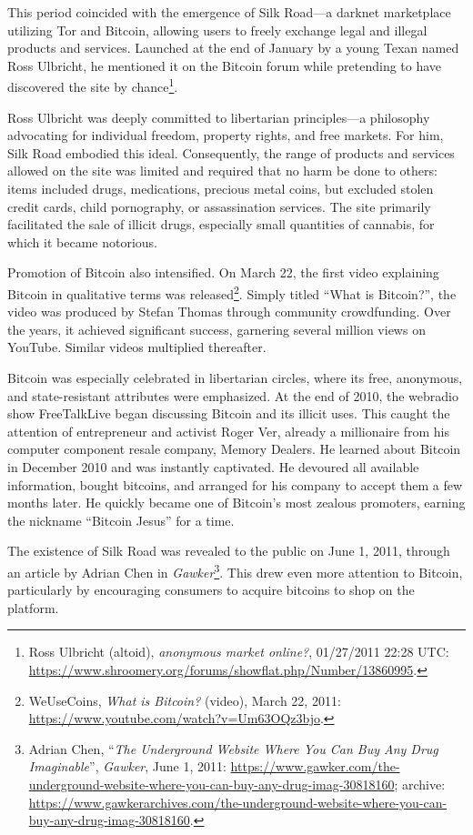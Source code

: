 \documentclass[
  a5paper,
  smalldemyvopaper,10pt,twoside,onecolumn,openright,extrafontsizes,hidelinks]{memoir}
\begin{document}
This period coincided with the emergence of Silk Road---a darknet
marketplace utilizing Tor and Bitcoin, allowing users to freely exchange
legal and illegal products and services. Launched at the end of January
by a young Texan named Ross Ulbricht, he mentioned it on the Bitcoin
forum while pretending to have discovered the site by chance\footnote{Ross
  Ulbricht (altoid), \emph{anonymous market online?}, 01/27/2011 22:28
  UTC:
  \url{https://www.shroomery.org/forums/showflat.php/Number/13860995}.}.

Ross Ulbricht was deeply committed to libertarian principles---a
philosophy advocating for individual freedom, property rights, and free
markets. For him, Silk Road embodied this ideal. Consequently, the range
of products and services allowed on the site was limited and required
that no harm be done to others: items included drugs, medications,
precious metal coins, but excluded stolen credit cards, child
pornography, or assassination services. The site primarily facilitated
the sale of illicit drugs, especially small quantities of cannabis, for
which it became notorious.

Promotion of Bitcoin also intensified. On March 22, the first video
explaining Bitcoin in qualitative terms was released\footnote{WeUseCoins,
  \emph{What is Bitcoin?} (video), March 22, 2011:
  \url{https://www.youtube.com/watch?v=Um63OQz3bjo}.}. Simply titled
``What is Bitcoin?'', the video was produced by Stefan Thomas through
community crowdfunding. Over the years, it achieved significant success,
garnering several million views on YouTube. Similar videos multiplied
thereafter.

Bitcoin was especially celebrated in libertarian circles, where its
free, anonymous, and state-resistant attributes were emphasized. At the
end of 2010, the webradio show FreeTalkLive began discussing Bitcoin and
its illicit uses. This caught the attention of entrepreneur and activist
Roger Ver, already a millionaire from his computer component resale
company, Memory Dealers. He learned about Bitcoin in December 2010 and
was instantly captivated. He devoured all available information, bought
bitcoins, and arranged for his company to accept them a few months
later. He quickly became one of Bitcoin's most zealous promoters,
earning the nickname ``Bitcoin Jesus'' for a time.

The existence of Silk Road was revealed to the public on June 1, 2011,
through an article by Adrian Chen in \emph{Gawker}\footnote{Adrian Chen,
  ``\emph{The Underground Website Where You Can Buy Any Drug
  Imaginable}'', \emph{Gawker}, June 1, 2011:
  \url{https://www.gawker.com/the-underground-website-where-you-can-buy-any-drug-imag-30818160};
  archive:
  \url{https://www.gawkerarchives.com/the-underground-website-where-you-can-buy-any-drug-imag-30818160}.}.
This drew even more attention to Bitcoin, particularly by encouraging
consumers to acquire bitcoins to shop on the platform.
\end{document}
